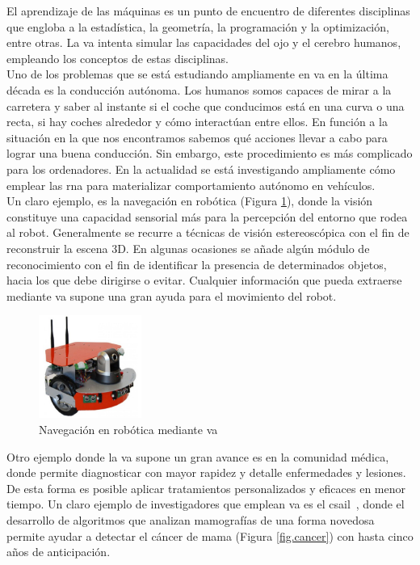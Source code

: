El aprendizaje de las máquinas es un punto de encuentro de diferentes disciplinas que engloba a la estadística, la geometría, la programación y la optimización, entre otras. La \acrshort{va} intenta simular las capacidades del ojo y el cerebro humanos, empleando los conceptos de estas disciplinas.\\

Uno de los problemas que se está estudiando ampliamente en \acrshort{va} en la última década es la conducción autónoma. Los humanos somos capaces de mirar a la carretera y saber al instante si el coche que conducimos está en una curva o una recta, si hay coches alrededor y cómo interactúan entre ellos. En función a la situación en la que nos encontramos sabemos qué acciones llevar a cabo para lograr una buena conducción.  Sin embargo, este procedimiento es más complicado para los ordenadores. En la actualidad se está investigando ampliamente cómo emplear las \acrfull{rna} para materializar comportamiento autónomo en vehículos.\\

Un claro ejemplo, es la navegación en robótica (Figura \ref{fig.robot}), donde la visión constituye una capacidad sensorial más para la percepción del entorno que rodea al robot. Generalmente se recurre a técnicas de visión estereoscópica con el fin de reconstruir la escena 3D. En algunas ocasiones se añade algún módulo de reconocimiento con el fin de identificar la presencia de determinados objetos, hacia los que debe dirigirse o evitar. Cualquier información que pueda extraerse mediante \acrshort{va} supone una gran ayuda para el movimiento del robot. \\

\begin{figure}[H]
  \begin{center}
    \includegraphics[width=0.3\textwidth]{figures/Introduccion/robot.jpg}
		\caption{Navegación en robótica mediante \acrshort{va}}
		\label{fig.robot}
		\end{center}
\end{figure}


Otro ejemplo donde la \acrshort{va} supone un gran avance es en la comunidad médica, donde permite diagnosticar con mayor rapidez y detalle enfermedades y lesiones. De esta forma es posible aplicar tratamientos personalizados y eficaces en menor tiempo. Un claro ejemplo de investigadores que emplean \acrshort{va} es el \acrfull{csail}~\cite{cancer}, donde el desarrollo de algoritmos que analizan mamografías de una forma novedosa permite ayudar a detectar el cáncer de mama (Figura \ref{fig.cancer}) con hasta cinco años de anticipación.\\

